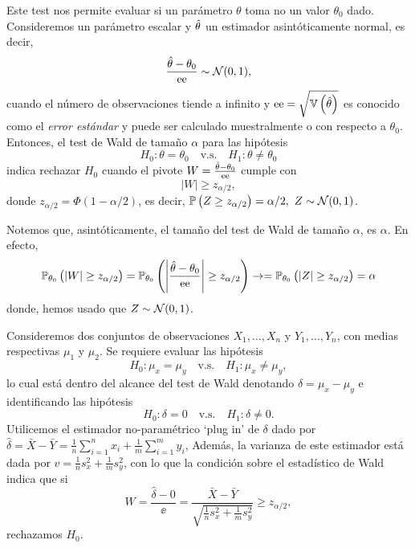Este test nos permite evaluar si un parámetro $\theta$ toma no un valor $\theta_0$ dado. Consideremos un parámetro escalar y ${\hat\theta}$ un estimador asintóticamente normal, es decir, 
\begin{equation}
	\frac{{\hat\theta} - \theta_0}{{\text{ee}}} \sim {\mathcal N}(0,1),
\end{equation}
cuando el número de observaciones tiende a infinito y ${\text{ee}}=\sqrt{\mathbb{V} \left({\hat\theta}\right)}$ es conocido como el \emph{error estándar} y puede ser calculado muestralmente o con respecto a $\theta_0$. Entonces, el test de Wald de tamaño $\alpha$ para las hipótesis 
	\begin{equation}
		H_0:\theta =\theta_0\quad \text{v.s.}\quad H_1:\theta \neq \theta_0
	\end{equation}
indica rechazar $H_0$ cuando el pivote $W=\frac{{\hat\theta} - \theta_0}{{\text{ee}}}$ cumple con 
\begin{equation}
	|W|\geq z_{\alpha/2},
\end{equation}
donde $z_{\alpha/2}=\Phi(1-\alpha/2)$, es decir, $\mathbb{P} \left(Z\geq z_{\alpha/2}\right)=\alpha/2,\ Z\sim{\mathcal N}(0,1)$. 

\begin{remark}
	Notemos que, asintóticamente, el tamaño del test de Wald de tamaño  $\alpha$, es $\alpha$. En efecto, 
\begin{equation}
	\mathbb{P}_{\theta_0} \left(|W|\geq z_{\alpha/2}\right) = \mathbb{P}_{\theta_0} \left(\left|\frac{{\hat\theta} - \theta_0}{{\text{ee}}}\right|\geq z_{\alpha/2}\right) \rightarrow  = \mathbb{P}_{\theta_0} \left(|Z|\geq z_{\alpha/2}\right) = \alpha
\end{equation}
donde, hemos usado que $Z\sim{\mathcal N}(0,1)$.
\end{remark}


\begin{example}
 Consideremos dos conjuntos de observaciones $X_1,\ldots,X_n$ y $Y_1,\ldots,Y_n$, con medias respectivas $\mu_1$ y $\mu_2$. Se requiere evaluar las hipótesis
 	\begin{equation}
		H_0:\mu_x =\mu_y \quad \text{v.s.}\quad H_1:\mu_x \neq \mu_y,
	\end{equation}
	lo cual está dentro del alcance del test de Wald denotando $\delta = \mu_x - \mu_y$ e identificando las hipótesis
	 	\begin{equation}
		H_0:\delta =0 \quad \text{v.s.}\quad H_1:\delta \neq 0.
	\end{equation}
Utilicemos el estimador no-paramétrico `plug in' de $\delta$ dado por  $\hat{\delta} = \bar{X}-\bar{Y} = \frac{1}{n}\sum_{i=1}^n x_i + \frac{1}{m}\sum_{i=1}^m y_i$, Además, la varianza de este estimador está dada por $v = \frac{1}{n}s_x^2 + \frac{1}{m}s_y^2$, con lo que la condición sobre el  estadístico de Wald indica que si 
\begin{equation}
	W = \frac{\hat{\delta}-0}{\ee} = \frac{\bar{X}-\bar{Y}}{\sqrt{\frac{1}{n}s_x^2 + \frac{1}{m}s_y^2}} \geq z_{\alpha/2},
\end{equation}
rechazamos $H_0$. 
\end{example}

